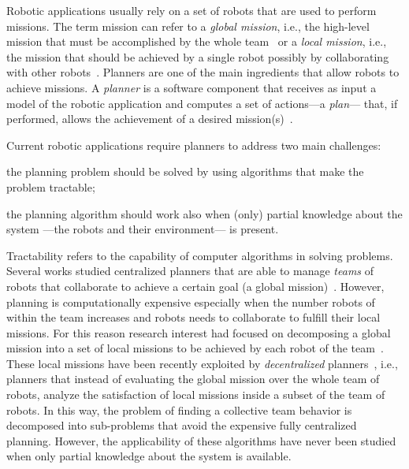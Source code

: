 Robotic applications usually rely on a set of robots that are used to perform missions.
The term mission can refer to a \emph{global mission}, i.e., the high-level mission that must be accomplished by the whole team~\cite{quottrup2004multi} or a \emph{local mission}, i.e., the mission that should be achieved by a single robot possibly by collaborating with other robots~\cite{tumova2016multi}.
Planners are one of the main ingredients that allow robots to achieve  missions.
A \emph{planner} is  a software component that receives as input a model of the robotic application and computes  a set of actions---a \emph{plan}--- that, if performed, allows the achievement of a desired mission(s)~\cite{latombe2012robot}.

Current robotic applications require planners to address two main challenges: 
\begin{enumerate*}
\item the planning problem should be solved by using algorithms that make the problem tractable;
\item the planning algorithm should work also when (only) partial knowledge about the system ---the robots and their environment--- is present.
\end{enumerate*}

Tractability refers to the capability of computer algorithms in solving problems. 
Several works studied centralized planners that are able to manage \emph{teams} of robots that collaborate to achieve a certain goal (a global mission)~\cite{kloetzer2011multi,loizou2005automated,quottrup2004multi}.
However, planning is computationally expensive especially when the number robots of within the team increases and robots needs to collaborate to fulfill their local missions.
For this reason research interest had focused on decomposing a global mission into a set of local missions to be achieved by each robot of the team~\cite{schillinger2016decomposition,guo2015multi,guo2015multi,tumova2016multi}. 
These local missions have been recently exploited by \emph{decentralized} planners~\cite{tumova2016multi}, i.e., planners that instead of evaluating the global mission over the whole team of robots, analyze the satisfaction of local missions inside a subset of the team of robots. 
In this way, the problem of finding a collective team behavior is decomposed into sub-problems that avoid the expensive fully centralized planning. 
However, the applicability of these algorithms have never been studied when only partial knowledge about the system is available.

